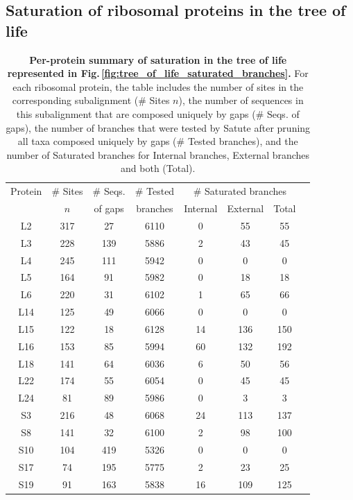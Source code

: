 \begin{appendices}
\iffalse
\subsection{Saturation of ribosomal proteins in the tree of life}
\begin{table}[h!]
     \centering 
    \begin{tabular}{|c|c|c|c|c|c|c|c|}
      \hline
       Protein & \# Sites & \# Seqs. & \# Tested  &\multicolumn{3}{c|}{\# Saturated branches}\\
& $n$ & of gaps &branches& Internal & External & Total\\
\hline
L2  & 317 &  27 & 6110 &  0 &  55 &  55\\
L3  & 228 & 139 & 5886 &  2 &  43 &  45\\
L4  & 245 & 111 & 5942 &  0 &   0 &   0\\
L5  & 164 &  91 & 5982 &  0 &  18 &  18\\
L6  & 220 &  31 & 6102 &  1 &  65 &  66\\
L14 & 125 &  49 & 6066 &  0 &   0 &   0\\
L15 & 122 &  18 & 6128 & 14 & 136 & 150\\
L16 & 153 &  85 & 5994 & 60 & 132 & 192\\
L18 & 141 &  64 & 6036 &  6 &  50 &  56\\
L22 & 174 &  55 & 6054 &  0 &  45 &  45\\
L24 &  81 &  89 & 5986 &  0 &   3 &   3\\
S3  & 216 &  48 & 6068 & 24 & 113 & 137\\
S8  & 141 &  32 & 6100 &  2 &  98 & 100\\
S10 & 104 & 419 & 5326 &  0 &   0 &   0\\
S17 &  74 & 195 & 5775 &  2 &  23 &  25\\
S19 &  91 & 163 & 5838 & 16 & 109 & 125\\
\hline
     \end{tabular}
     \vspace{0.25cm}
     \caption{ \textbf{Per-protein summary of saturation in the tree of life represented in Fig.\,\ref{fig:tree_of_life_saturated_branches}.} For each ribosomal protein, the table includes the number of sites in the corresponding subalignment (\# Sites $n$), the number of sequences in this subalignment that are composed uniquely by gaps (\# Seqs. of gaps), the number of branches that were tested by Satute after pruning all taxa composed uniquely by gaps (\# Tested branches),  and the number of Saturated branches for Internal branches, External branches and both (Total).}
	\label{table:per_protein_summary}
    \end{table}




\end{appendices}
